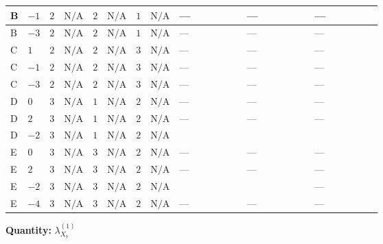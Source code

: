 \documentclass[8pt]{article}
\begin{document}
\begin{landscape}
\begin{longtable}{@{}llcccccc >{\raggedright\arraybackslash}p{0.21\linewidth} >{\raggedright\arraybackslash}p{0.21\linewidth} >{\raggedright\arraybackslash}p{0.21\linewidth}@{}}
\midrule
B & $-1$ & $2$ & $\text{N/A}$ & $2$ & $\text{N/A}$ & $1$ & $\text{N/A}$ & --- & --- & --- \\
\midrule
B & $-3$ & $2$ & $\text{N/A}$ & $2$ & $\text{N/A}$ & $1$ & $\text{N/A}$ & --- & --- & --- \\
\midrule
C & $1$ & $2$ & $\text{N/A}$ & $2$ & $\text{N/A}$ & $3$ & $\text{N/A}$ & --- & --- & --- \\
\midrule
C & $-1$ & $2$ & $\text{N/A}$ & $2$ & $\text{N/A}$ & $3$ & $\text{N/A}$ & --- & --- & --- \\
\midrule
C & $-3$ & $2$ & $\text{N/A}$ & $2$ & $\text{N/A}$ & $3$ & $\text{N/A}$ & --- & --- & --- \\
\midrule
D & $0$ & $3$ & $\text{N/A}$ & $1$ & $\text{N/A}$ & $2$ & $\text{N/A}$ & --- & --- & --- \\
\midrule
D & $2$ & $3$ & $\text{N/A}$ & $1$ & $\text{N/A}$ & $2$ & $\text{N/A}$ & --- & --- & --- \\
\midrule
D & $-2$ & $3$ & $\text{N/A}$ & $1$ & $\text{N/A}$ & $2$ & $\text{N/A}$ & \scriptsize\adjustbox{max width=\linewidth}{$\begin{gathered} +{\lambda_{12}^{(1)}} (6 {\lambda_{X_{2}}}+8 {\lambda_{X_{7}}^{(1)}})\end{gathered}$} & \scriptsize\adjustbox{max width=\linewidth}{$\begin{gathered} +4 {\lambda_{HS_1}^{(1)}} {\lambda_{X_{16}}}\end{gathered}$} & \scriptsize\adjustbox{max width=\linewidth}{$\begin{gathered} +8 {\lambda_{S_1}^{(1)}} {\lambda_{X_{7}}^{(1)}}\end{gathered}$} \\
\midrule
E & $0$ & $3$ & $\text{N/A}$ & $3$ & $\text{N/A}$ & $2$ & $\text{N/A}$ & --- & --- & --- \\
\midrule
E & $2$ & $3$ & $\text{N/A}$ & $3$ & $\text{N/A}$ & $2$ & $\text{N/A}$ & --- & --- & --- \\
\midrule
E & $-2$ & $3$ & $\text{N/A}$ & $3$ & $\text{N/A}$ & $2$ & $\text{N/A}$ & \scriptsize\adjustbox{max width=\linewidth}{$\begin{gathered} +{\lambda_{12}^{(1)}} (10 {\lambda_{X_{2}}}+8 {\lambda_{X_{7}}^{(1)}})\end{gathered}$} & \scriptsize\adjustbox{max width=\linewidth}{$\begin{gathered} +4 {\lambda_{HS_1}^{(1)}} {\lambda_{X_{16}}}\end{gathered}$} & --- \\
\midrule
E & $-4$ & $3$ & $\text{N/A}$ & $3$ & $\text{N/A}$ & $2$ & $\text{N/A}$ & --- & --- & --- \\
\midrule
\bottomrule
\end{longtable}
\clearpage
\noindent\textbf{Quantity: }${\lambda_{X_{7}}^{(1)}}$\par\smallskip

\end{landscape}
\end{document}
